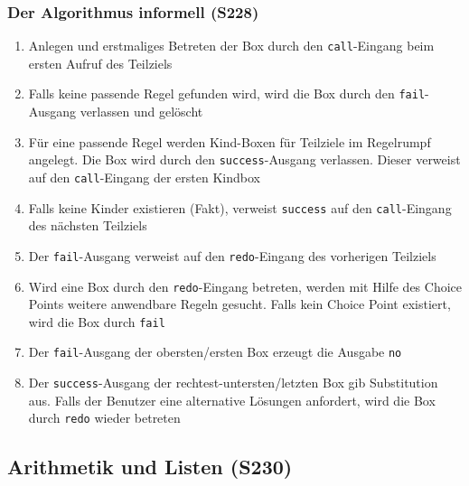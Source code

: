 \subsubsection{Der Algorithmus informell (S228)}
\begin{enumerate}
	\item Anlegen und erstmaliges Betreten der Box durch den \texttt{call}-Eingang beim ersten Aufruf des Teilziels
	\item Falls keine passende Regel gefunden wird, wird die Box durch den \texttt{fail}-Ausgang verlassen und gelöscht
	\item Für eine passende Regel werden Kind-Boxen für Teilziele im Regelrumpf angelegt. Die Box wird durch den \texttt{success}-Ausgang verlassen. Dieser verweist auf den \texttt{call}-Eingang der ersten Kindbox
	\item Falls keine Kinder existieren (Fakt), verweist \texttt{success} auf den \texttt{call}-Eingang des nächsten Teilziels
	\item Der \texttt{fail}-Ausgang verweist auf den \texttt{redo}-Eingang des vorherigen Teilziels
	\item Wird eine Box durch den \texttt{redo}-Eingang betreten, werden mit Hilfe des Choice Points weitere anwendbare Regeln gesucht. Falls kein Choice Point existiert, wird die Box durch \texttt{fail}
	\item Der \texttt{fail}-Ausgang der obersten/ersten Box erzeugt die Ausgabe \texttt{no}
	\item Der \texttt{success}-Ausgang der rechtest-untersten/letzten Box gib Substitution aus. Falls der Benutzer eine alternative Lösungen anfordert, wird die Box durch \texttt{redo} wieder betreten
\end{enumerate}


\subsection{Arithmetik und Listen (S230)}

